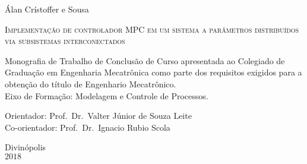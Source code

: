 \begin{center}
    \large Álan Crístoffer e Sousa
\end{center}

\vspace*{1.5cm}

\begin{center}
    \Large{\textsc{Implementação de controlador MPC em um sistema a parâmetros
                  distribuídos via subsistemas interconectados}} %
\end{center}

\vspace*{1.5cm}

\begin{flushright}
    \begin{minipage}{9.0cm}
        Monografia de Trabalho de Conclusão de Curso apresentada ao Colegiado de
        Graduação em Engenharia Mecatrônica como  parte dos requisitos exigidos
        para a obtenção do título de Engenhario Mecatrônico.\\
        Eixo de Formação: Modelagem e Controle de Processos.

        \vspace*{1cm}

        Orientador: Prof.\ Dr.\ Valter Júnior de Souza Leite\\
        Co-orientador: Prof.\ Dr.\ Ignacio Rubio Scola
    \end{minipage}
\end{flushright}

\vspace*{1cm}

\columnwidth{}
\centerline{} %

\null\vfill

\begin{center}
    Divinópolis\\
    \(2018\) %
\end{center}

\cleardoublepage{}


\cleardoublepage{}


\cleardoublepage{}
